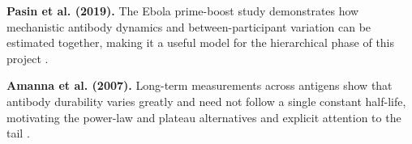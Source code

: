 \documentclass[11pt,a4paper]{article}
\begin{document}
\textbf{Pasin et al. (2019).} The Ebola prime-boost study demonstrates how mechanistic antibody
dynamics and between-participant variation can be estimated together, making it a useful model for
the hierarchical phase of this project \parencite{pasin2019}.

\textbf{Amanna et al. (2007).} Long-term measurements across antigens show that antibody durability
varies greatly and need not follow a single constant half-life, motivating the power-law and
plateau alternatives and explicit attention to the tail \parencite{amanna2007}.

\printbibliography[title={Selected literature}]
\end{document}
